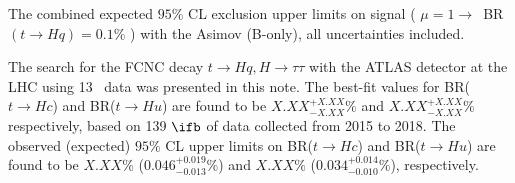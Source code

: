 \begin{table}[htb]
\caption{ The combined expected $95\%$ CL exclusion upper limits on signal ( $\mu=1\to$~BR$(t\to Hq)=0.1\%$ ) with the Asimov (B-only), all uncertainties included.}

\label{tab:limit}
\end{table}


The search for the FCNC decay $t\to Hq, H\to\tau\tau$ with the ATLAS detector at the LHC using 13~\TeV{} data was presented in this note. The best-fit values for BR($t\to Hc$) and BR($t\to Hu$) are found to be $X.XX^{+X.XX}_{-X.XX}\%$ and $X.XX^{+X.XX}_{-X.XX}\%$ respectively, based on 139 $\ifb$ of data collected from 2015 to 2018. The observed (expected) $95\%$ CL upper limits on BR($t\to Hc$) and BR($t\to Hu$) are found to be $X.XX\%$ ($0.046^{+0.019}_{-0.013}\%$) and $X.XX\%$ ($0.034^{+0.014}_{-0.010}\%$), respectively.
